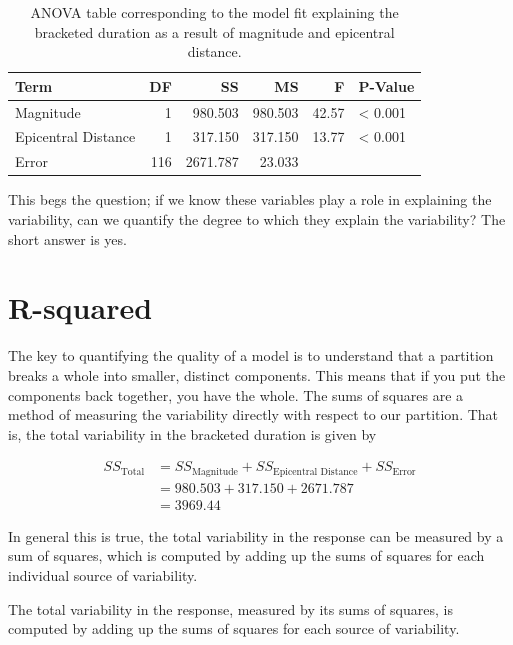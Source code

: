 \documentclass[]{book}
\theoremstyle{definition}
\theoremstyle{definition}
\theoremstyle{definition}
\theoremstyle{remark}
\let\BeginKnitrBlock\begin \let\EndKnitrBlock\end
\begin{document}
\begin{table}

\caption{\label{tab:regquality-anova}ANOVA table corresponding to the model fit explaining the bracketed duration as a result of magnitude and epicentral distance.}
\centering
\begin{tabular}[t]{l|r|r|r|r|l}
\hline
Term & DF & SS & MS & F & P-Value\\
\hline
Magnitude & 1 & 980.503 & 980.503 & 42.57 & < 0.001\\
\hline
Epicentral Distance & 1 & 317.150 & 317.150 & 13.77 & < 0.001\\
\hline
Error & 116 & 2671.787 & 23.033 &  & \\
\hline
\end{tabular}
\end{table}

This begs the question; if we know these variables play a role in
explaining the variability, can we quantify the degree to which they
explain the variability? The short answer is yes.

\section{R-squared}\label{r-squared}

The key to quantifying the quality of a model is to understand that a
partition breaks a whole into smaller, distinct components. This means
that if you put the components back together, you have the whole. The
sums of squares are a method of measuring the variability directly with
respect to our partition. That is, the total variability in the
bracketed duration is given by

\[
\begin{aligned}
  SS_{\text{Total}} &= SS_{\text{Magnitude}} + SS_{\text{Epicentral Distance}} + SS_{\text{Error}} \\
    &= 980.503 + 317.150 + 2671.787 \\
    &= 3969.44
\end{aligned}
\]

In general this is true, the total variability in the response can be
measured by a sum of squares, which is computed by adding up the sums of
squares for each individual source of variability.

\BeginKnitrBlock{rmdtip}
The total variability in the response, measured by its sums of squares,
is computed by adding up the sums of squares for each source of
variability.
\EndKnitrBlock{rmdtip}
\end{document}
